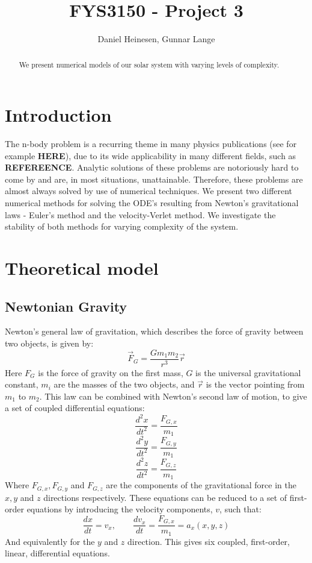 \documentclass[a4paper, 10pt]{article}
\title{FYS3150 - Project 3}
\author{Daniel Heinesen, Gunnar Lange}
\begin{document}
\maketitle
\begin{abstract}
We present numerical models of our solar system with varying levels of complexity.
\end{abstract}

\tableofcontents
\newpage
\section{Introduction}
The n-body problem is a recurring theme in many physics publications (see for example \textbf{HERE}), due to its wide applicability in many different fields, such as \textbf{REFEREENCE}.  Analytic solutions of these problems are notoriously hard to come by and are, in most situations, unattainable. Therefore, these problems are almost always solved by use of numerical techniques. We present two different numerical methods for solving the ODE's resulting from Newton's gravitational laws - Euler's method and the velocity-Verlet method. We investigate the stability of both methods for varying complexity of the system.
\section{Theoretical model}\label{Theoretical_section}
\subsection{Newtonian Gravity}\label{Newtonian_Gravity}
Newton's general law of gravitation, which describes the force of gravity between two objects, is given by:
\begin{equation}
\vec{F}_{G}=\frac{Gm_1m_2}{r^3}\vec{r}
\end{equation}
Here $F_G$ is the force of gravity on the first mass, $G$ is the universal gravitational constant, $m_i$ are the masses of the two objects, and $\vec{r}$ is the vector pointing from $m_1$ to $m_2$. This law can be combined with Newton's second law of motion, to give a set of coupled differential equations:
\begin{equation}\label{eq:coupled_diff_1}
\frac{d^2x}{dt^2}=\frac{F_{G,x}}{m_1}
\end{equation} 
\begin{equation}\label{eq:coupled_diff_2}
\frac{d^2 y}{dt^2}=\frac{F_{G,y}}{m_1}
\end{equation}
\begin{equation}\label{eq:coupled_diff_3}
\frac{d^2 z}{dt^2}=\frac{F_{G,z}}{m_1}
\end{equation}
Where $F_{G,x}, F_{G,y}$ and $F_{G,z}$ are the components of the gravitational force in the $x, y$ and $z$ directions respectively. These equations can be reduced to a set of first-order equations by introducing the velocity components, $v$, such that:
\begin{equation}\label{eq:Velocity_position_equation}
\frac{dx}{dt}=v_x, \quad \quad \frac{dv_x}{dt}=\frac{F_{G,x}}{m_1}=a_x(x,y,z)
\end{equation}
And equivalently for the $y$ and $z$ direction. This gives six coupled, first-order, linear, differential equations.
\end{document}
